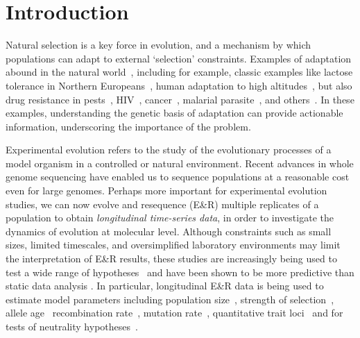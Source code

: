 \section{Introduction}
Natural selection is a key force in evolution, and a mechanism by
which populations can adapt to external `selection'
constraints. Examples of adaptation abound in the natural
world~\cite{going2016fan}, including for example, classic examples
like lactose tolerance in Northern
Europeans~\cite{bersaglieri2004genetic}, human adaptation to high
altitudes~\cite{yi2010sequencing,simonson2010genetic}, but also drug
resistance in pests~\cite{daborn2001ddt}, HIV~\cite{Feder2016More},
cancer~\cite{gottesman2002mechanisms,zahreddine2013mechanisms},
malarial parasite~\cite{ariey2014molecular,nair2007recurrent}, and
others~\cite{spellberg2008epidemic}. In these examples, understanding
the genetic basis of adaptation can provide actionable information,
underscoring the importance of the problem.


Experimental evolution refers to the study of the evolutionary
processes of a model organism in a controlled
\cite{hegreness2006equivalence,lang2013pervasive,orozco2012adaptation,
  lang2011genetic,barrick2009genome,bollback2007clonal,oz2014strength}
or natural
\cite{maldarelli2013hiv,reid2011new,denef2012situ,winters2012development,
  daniels2013genetic,barrett2008natural,bergland2014genomic}
environment. Recent advances in whole genome sequencing have enabled
us to sequence populations at a reasonable cost even for large
genomes. Perhaps more important for experimental evolution studies, we
can now evolve and resequence (E\&R) multiple replicates of a population to
obtain \emph{longitudinal time-series data}, in order to investigate
the dynamics of evolution at molecular level.  Although constraints
such as small sizes, limited timescales, and oversimplified
laboratory environments may limit the interpretation of E\&R results,
these studies are increasingly being used to test a wide range of
hypotheses~\cite{kawecki2012experimental} and have been shown to be
more predictive than static data analysis
\cite{boyko2008assessing,desai2008polymorphism,sawyer1992population}.
In particular, longitudinal E\&R data is being used to estimate model
parameters including population
size~\cite{williamson1999using,wang2001pseudo,pollak1983new,waples1989generalized,
  Terhorst2015Multi, jonas2016estimating}, strength of
selection~\cite{mathieson2013estimating,illingworth2011distinguishing,Terhorst2015Multi,
  bollback2008estimation,illingworth2012quantifying,malaspinas2012estimating,
  steinrucken2014novel}, allele age~\cite{malaspinas2012estimating}
recombination rate~\cite{Terhorst2015Multi}, mutation
rate~\cite{Barrick2013Genome, Terhorst2015Multi}, quantitative trait
loci~\cite{baldwin2014power} and for tests of neutrality
hypotheses~\cite{feder2014Identifying,Terhorst2015Multi,burke2010genome,bergland2014genomic}.


